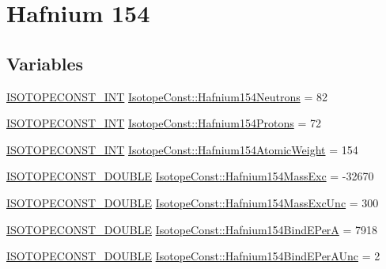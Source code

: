 \hypertarget{group___isotope_const-_hafnium-_hf154}{}\section{Hafnium 154}
\label{group___isotope_const-_hafnium-_hf154}
\subsection*{Variables}
\begin{DoxyCompactItemize}
\item 
\mbox{\hyperlink{group___isotope_const-_macros_ga5f18360b3e99483a35c32d789e62621c}{I\+S\+O\+T\+O\+P\+E\+C\+O\+N\+S\+T\+\_\+\+I\+NT}} \mbox{\hyperlink{group___isotope_const-_hafnium-_hf154_ga01a2cb8c0eceb2e4460df6d6d74174bd}{Isotope\+Const\+::\+Hafnium154\+Neutrons}} = 82
\item 
\mbox{\hyperlink{group___isotope_const-_macros_ga5f18360b3e99483a35c32d789e62621c}{I\+S\+O\+T\+O\+P\+E\+C\+O\+N\+S\+T\+\_\+\+I\+NT}} \mbox{\hyperlink{group___isotope_const-_hafnium-_hf154_gaeae7ddfe97c8153fb5def7b111028ec8}{Isotope\+Const\+::\+Hafnium154\+Protons}} = 72
\item 
\mbox{\hyperlink{group___isotope_const-_macros_ga5f18360b3e99483a35c32d789e62621c}{I\+S\+O\+T\+O\+P\+E\+C\+O\+N\+S\+T\+\_\+\+I\+NT}} \mbox{\hyperlink{group___isotope_const-_hafnium-_hf154_gadc69edaf5f96bbb0a3d1bb0a7e9c4a2d}{Isotope\+Const\+::\+Hafnium154\+Atomic\+Weight}} = 154
\item 
\mbox{\hyperlink{group___isotope_const-_macros_ga8f45a7272ce02c0b4c65c44636ed719a}{I\+S\+O\+T\+O\+P\+E\+C\+O\+N\+S\+T\+\_\+\+D\+O\+U\+B\+LE}} \mbox{\hyperlink{group___isotope_const-_hafnium-_hf154_ga4f5e5ffaa2d84c6ae46f6f9660ce47fa}{Isotope\+Const\+::\+Hafnium154\+Mass\+Exc}} = -\/32670
\item 
\mbox{\hyperlink{group___isotope_const-_macros_ga8f45a7272ce02c0b4c65c44636ed719a}{I\+S\+O\+T\+O\+P\+E\+C\+O\+N\+S\+T\+\_\+\+D\+O\+U\+B\+LE}} \mbox{\hyperlink{group___isotope_const-_hafnium-_hf154_ga28c119e998334f0756b303a036df3fde}{Isotope\+Const\+::\+Hafnium154\+Mass\+Exc\+Unc}} = 300
\item 
\mbox{\hyperlink{group___isotope_const-_macros_ga8f45a7272ce02c0b4c65c44636ed719a}{I\+S\+O\+T\+O\+P\+E\+C\+O\+N\+S\+T\+\_\+\+D\+O\+U\+B\+LE}} \mbox{\hyperlink{group___isotope_const-_hafnium-_hf154_ga6d40dbd067dd280973486fd41ba42fe4}{Isotope\+Const\+::\+Hafnium154\+Bind\+E\+PerA}} = 7918
\item 
\mbox{\hyperlink{group___isotope_const-_macros_ga8f45a7272ce02c0b4c65c44636ed719a}{I\+S\+O\+T\+O\+P\+E\+C\+O\+N\+S\+T\+\_\+\+D\+O\+U\+B\+LE}} \mbox{\hyperlink{group___isotope_const-_hafnium-_hf154_ga09441e9f939546248adad660437c17f9}{Isotope\+Const\+::\+Hafnium154\+Bind\+E\+Per\+A\+Unc}} = 2

\end{DoxyCompactItemize}
